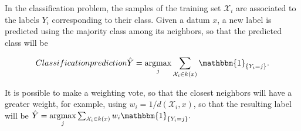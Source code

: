 
In the classification problem, the samples of the training set
$\mathcal{X}_i$ are associated to the labels $Y_i$ corresponding to their class.
Given a datum $x$, a new label is predicted using the majority class among
its neighbors, so that the predicted class will be

\begin{equation}{Classification prediction}
\hat Y =\underset{j}{\operatorname{argmax}} \sum_{\mathcal{X}_i \in k(x)} \mathbbm{1}_{\{ Y_i = j\}}.
\end{equation}

It is possible to make a weighting vote, so that the closest neighbors will have
a greater weight, for example, using $w_i=1/d(\mathcal{X}_i, x)$, so that the
resulting label will be
$
\hat Y = \underset{j}{\operatorname{argmax}}  \sum_{\mathcal{X}_i \in k(x)} w_i\mathbbm{1}_{\{ Y_i = j\}}.
$

